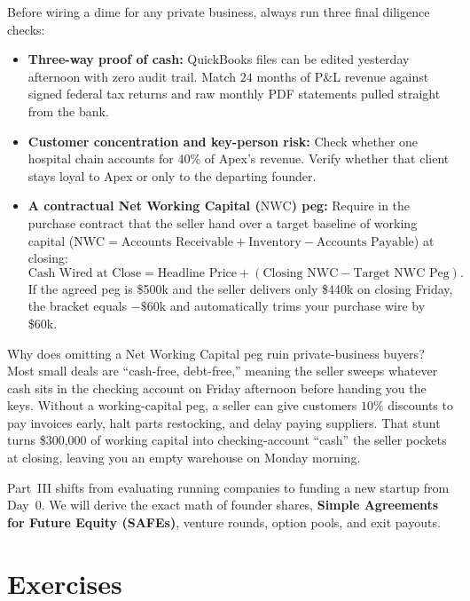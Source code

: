 Before wiring a dime for any private business, always run three final diligence checks:
\begin{itemize}
  \item \textbf{Three-way proof of cash:} QuickBooks files can be edited yesterday afternoon with zero audit trail. Match $24$ months of P\&L revenue against signed federal tax returns and raw monthly PDF statements pulled straight from the bank.
  \item \textbf{Customer concentration and key-person risk:} Check whether one hospital chain accounts for $40\%$ of Apex's revenue. Verify whether that client stays loyal to Apex or only to the departing founder.
  \item \textbf{A contractual Net Working Capital ($\text{NWC}$) peg:} Require in the purchase contract that the seller hand over a target baseline of working capital ($\text{NWC} = \text{Accounts Receivable} + \text{Inventory} - \text{Accounts Payable}$) at closing:
  \[
    \text{Cash Wired at Close} = \text{Headline Price} + (\text{Closing NWC} - \text{Target NWC Peg}).
  \]
  If the agreed peg is \$500k and the seller delivers only \$440k on closing Friday, the bracket equals $-\$60\text{k}$ and automatically trims your purchase wire by \$60k.
\end{itemize}

\begin{happeningbox}
Why does omitting a Net Working Capital peg ruin private-business buyers? Most small deals are ``cash-free, debt-free,'' meaning the seller sweeps whatever cash sits in the checking account on Friday afternoon before handing you the keys. Without a working-capital peg, a seller can give customers $10\%$ discounts to pay invoices early, halt parts restocking, and delay paying suppliers. That stunt turns \$300,000 of working capital into checking-account ``cash'' the seller pockets at closing, leaving you an empty warehouse on Monday morning.
\end{happeningbox}

Part~III shifts from evaluating running companies to funding a new startup from Day~0. We will derive the exact math of founder shares, \textbf{Simple Agreements for Future Equity (SAFEs)}, venture rounds, option pools, and exit payouts.

\section*{Exercises}

